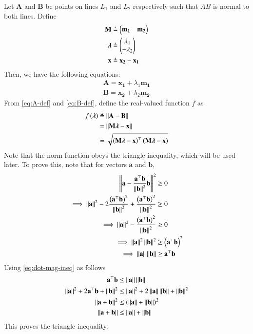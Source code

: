 \documentclass[journal,12pt,twocolumn]{IEEEtran}
\renewcommand{\vec}[1]{\boldsymbol{\mathbf{#1}}}
\begin{document}
\begin{enumerate}
    \solution Let $\vec{A}$ and $\vec{B}$ be points on lines $L_1$ and $L_2$
    respectively such that $AB$ is normal to both lines. Define
    \begin{align}
        \vec{M} &\triangleq \myvec{\vec{m_1} & \vec{m_2}} \label{eq:M-def} \\
        \vec{\lambda} &\triangleq \myvec{\lambda_1\\-\lambda_2} \label{eq:lambda-def} \\
        \vec{x} &\triangleq \vec{x_2} - \vec{x_1} \label{eq:x-def}
    \end{align}
    Then, we have the following equations:
    \begin{align}
        \vec{A} = \vec{x_1} + \lambda_1\vec{m_1} \label{eq:A-def} \\
        \vec{B} = \vec{x_2} + \lambda_2\vec{m_2} \label{eq:B-def}
    \end{align}
    From \eqref{eq:A-def} and \eqref{eq:B-def}, define the real-valued function
    $f$ as
    \begin{align}
        f\brak{\vec{\lambda}} &\triangleq \norm{\vec{A}-\vec{B}} \\
                              &= \norm{\vec{M}\vec{\lambda}-\vec{x}} \\
                              &= \sqrt{\brak{\vec{M\lambda}-\vec{x}}^\top\brak{\vec{M\lambda}-\vec{x}}}
        \label{eq:f-def}
    \end{align}
    Note that the norm function obeys the triangle inequality, which will be
    used later. To prove this, note that for vectors $\vec{a}$ and $\vec{b}$,
    \begin{align}
        \norm{\vec{a}-\frac{\vec{a}^\top\vec{b}}{\norm{\vec{b}}^2}\vec{b}}^2 &\ge 0 \\
        \implies \norm{\vec{a}}^2 - 2\frac{\brak{\vec{a}^\top\vec{b}}^2}{\norm{\vec{b}}^2} + \frac{\brak{\vec{a}^\top\vec{b}}^2}{\norm{\vec{b}}^2} &\ge 0 \\
        \implies \norm{\vec{a}}^2 - \frac{\brak{\vec{a}^\top\vec{b}}^2}{\norm{\vec{b}}^2} &\ge 0 \\
        \implies \norm{\vec{a}}^2\norm{\vec{b}}^2 &\ge \brak{\vec{a}^\top\vec{b}}^2 \\
        \implies \norm{\vec{a}}\norm{\vec{b}} &\ge \vec{a}^\top\vec{b}
        \label{eq:dot-mag-ineq}
    \end{align}
    Using \eqref{eq:dot-mag-ineq} as follows
    \begin{align}
        \vec{a}^\top\vec{b} &\le \norm{\vec{a}}\norm{\vec{b}} \\
        \norm{\vec{a}}^2 + 2\vec{a}^\top\vec{b} + \norm{\vec{b}}^2 &\le \norm{\vec{a}}^2 + 2\norm{\vec{a}}\norm{\vec{b}} + \norm{\vec{b}}^2 \\
        \norm{\vec{a}+\vec{b}}^2 &\le \brak{\norm{\vec{a}}+\norm{\vec{b}}}^2 \\
        \norm{\vec{a}+\vec{b}} &\le \norm{\vec{a}}+\norm{\vec{b}}
        \label{eq:triangle-ineq}
    \end{align}
    This proves the triangle inequality.


\end{enumerate}
\end{document}
